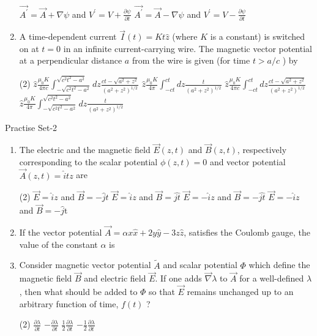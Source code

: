 \begin{enumerate}
\begin{tasks}
			\task[\textbf{C.}] $\overrightarrow{A^{\prime}}=\vec{A}+\nabla \psi$ and $V^{\prime}=V+\frac{\partial \psi}{\partial t}$
			\task[\textbf{D.}] $\overrightarrow{A^{\prime}}=\vec{A}-\nabla \psi$ and $V^{\prime}=V-\frac{\partial \psi}{\partial t}$
		\end{tasks}
\item
		A time-dependent current $\vec{I}(t)=K t \hat{z}$ (where $K$ is a constant) is switched on at $t=0$ in an infinite current-carrying wire. The magnetic vector potential at a perpendicular distance $a$ from the wire is given (for time $t>a / c$ ) by
	{	}
		\begin{tasks}(2)
			\task[\textbf{A.}]  $\hat{z} \frac{\mu_{0} K}{4 \pi c} \int_{-\sqrt{c^{2} t^{2}-a^{2}}}^{\sqrt{c^{2} t^{2}-a^{2}}} d z \frac{c t-\sqrt{a^{2}+z^{2}}}{\left(a^{2}+z^{2}\right)^{1 / 2}}$
			\task[\textbf{B.}]  $\hat{z} \frac{\mu_{0} K}{4 \pi} \int_{-c t}^{c t} d z \frac{t}{\left(a^{2}+z^{2}\right)^{1 / 2}}$
			\task[\textbf{C.}] $\hat{z} \frac{\mu_{0} K}{4 \pi c} \int_{-c t}^{c t} d z \frac{c t-\sqrt{a^{2}+z^{2}}}{\left(a^{2}+z^{2}\right)^{1 / 2}}$
			\task[\textbf{D.}] $\hat{z} \frac{\mu_{0} K}{4 \pi} \int_{-\sqrt{c^{2} t^{2}-a^{2}}}^{\sqrt{c^{2} t^{2}-a^{2}}} d z \frac{t}{\left(a^{2}+z^{2}\right)^{1 / 2}}$
		\end{tasks}
	\end{enumerate}
\newpage
\begin{abox}
	Practise Set-2
\end{abox}
\begin{enumerate}
		\item  The electric and the magnetic field $\vec{E}(z, t)$ and $\vec{B}(z, t)$, respectively corresponding to the scalar potential $\phi(z, t)=0$ and vector potential $\vec{A}(z, t)=\hat{i} t z$ are
	{\exyear{GATE 2012}}
	\begin{tasks}(2)
		\task[\textbf{A.}] $\vec{E}=\hat{i} z$ and $\vec{B}=-\hat{j} t$
		\task[\textbf{B.}]$\vec{E}=\hat{i} z$ and $\vec{B}=\hat{j t}$
		\task[\textbf{C.}]$\vec{E}=-\hat{i} z$ and $\vec{B}=-\hat{j t}$
		\task[\textbf{D.}]$\vec{E}=-\hat{i} z$ and $\vec{B}=-\hat{j} \mathrm{t}$
	\end{tasks}
		\item If the vector potential $\vec{A}=\alpha x \hat{x}+2 y \hat{y}-3 z \hat{z}$, satisfies the Coulomb gauge, the value of the constant $\alpha$ is
	{\exyear{GATE 2015}}
		\item Consider magnetic vector potential $\tilde{A}$ and scalar potential $\Phi$ which define the magnetic field $\vec{B}$ and electric field $\vec{E}$. If one adds $\vec{\nabla} \lambda$ to $\vec{A}$ for a well-defined $\lambda$, then what should be added to $\Phi$ so that $\vec{E}$ remains unchanged up to an arbitrary function of time, $f(t)$ ?
		{\exyear{JEST 2017}}
	\begin{tasks}(2)
		\task[\textbf{A.}] $\frac{\partial \lambda}{\partial t}$
		\task[\textbf{B.}]$-\frac{\partial \lambda}{\partial t}$
		\task[\textbf{C.}]$\frac{1}{2} \frac{\partial \lambda}{\partial t}$
		\task[\textbf{D.}]$-\frac{1}{2} \frac{\partial \lambda}{\partial t}$
	\end{tasks}
\end{enumerate}

